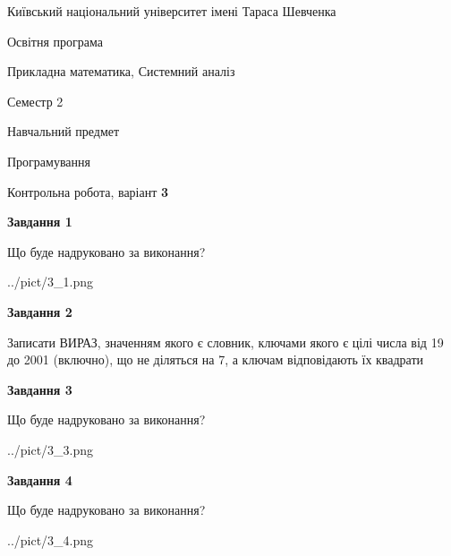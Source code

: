 \documentclass[12pt, ukrainian]{article}
\begin{document}
{{\begin {small}\par
{ \center  Київський національний університет імені Тараса Шевченка \par}
{\parbox {5 cm}{Освітня програма \hfill}{\parbox {8 cm}{Прикладна математика, Системний аналіз \hfill}}\parbox {5 cm}{\hfill Семестр 2}}\par
{\parbox {5 cm} {Навчальний предмет \hfill}\parbox {7 cm}{Програмування \hfill}\parbox {6cm}{\hfill}\par}\vspace{-7pt} \end{small}}{\center Контрольна робота, варіант  \No \textbf
{ 3 }\par}}
{
\begin {large}
{\begin {center}\textbf{Завдання 1}\end {center}}\par
Що буде надруковано за виконання?\par\par
\begin{center}
	{../pict/3_1.png}
\end{center}
\newpage

{\begin {center}\textbf{Завдання 2}\end {center}}\par
Записати ВИРАЗ, значенням якого є словник, ключами якого є цілі числа від 19 до 2001 (включно), що не діляться на 7, а ключам відповідають їх квадрати\par
\newpage

{\begin {center}\textbf{Завдання 3}\end {center}}\par
Що буде надруковано за виконання?\par
\begin{center}
	{../pict/3_3.png}
\end{center}
\newpage

{\begin {center}\textbf{Завдання 4}\end {center}}\par
Що буде надруковано за виконання?\par
\begin{center}
	{../pict/3_4.png}
\end{center}
\newpage


\end{large}}
\end{document}

